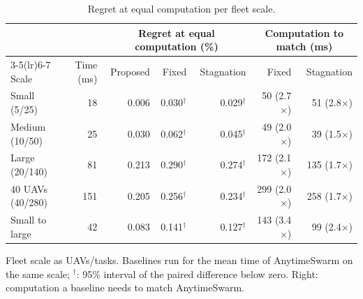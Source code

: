 \begin{table}[t]
\caption{Regret at equal computation per fleet scale.}
\label{tab:scale}
\centering
\setlength{\tabcolsep}{3pt}
\begin{threeparttable}
\begin{tabular}{lrrrrrr}
\toprule
 & & \multicolumn{3}{c}{Regret at equal computation (\%)} & \multicolumn{2}{c}{Computation to match (ms)} \\
\cmidrule(lr){3-5}\cmidrule(lr){6-7}
Scale & Time (ms) & Proposed & Fixed & Stagnation & Fixed & Stagnation \\
\midrule
Small (5/25) & 18 & 0.006 & 0.030$^{\dagger}$ & 0.029$^{\dagger}$ & 50 (2.7$\times$) & 51 (2.8$\times$) \\
Medium (10/50) & 25 & 0.030 & 0.062$^{\dagger}$ & 0.045$^{\dagger}$ & 49 (2.0$\times$) & 39 (1.5$\times$) \\
Large (20/140) & 81 & 0.213 & 0.290$^{\dagger}$ & 0.274$^{\dagger}$ & 172 (2.1$\times$) & 135 (1.7$\times$) \\
40 UAVs (40/280) & 151 & 0.205 & 0.256$^{\dagger}$ & 0.234$^{\dagger}$ & 299 (2.0$\times$) & 258 (1.7$\times$) \\
\midrule
Small to large & 42 & 0.083 & 0.141$^{\dagger}$ & 0.127$^{\dagger}$ & 143 (3.4$\times$) & 99 (2.4$\times$) \\
\bottomrule
\end{tabular}
\begin{tablenotes}[flushleft]\scriptsize
\item[] Fleet scale as UAVs/tasks. Baselines run for the mean time of AnytimeSwarm on the same scale; $^{\dagger}$: 95\% interval of the paired difference below zero. Right: computation a baseline needs to match AnytimeSwarm.
\end{tablenotes}
\end{threeparttable}
\end{table}
